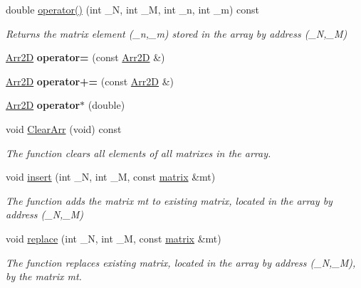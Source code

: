 \begin{DoxyCompactItemize}
\mbox{\label{class_arr2_d_acfb2cee23c6fdd3e85971580ac1966c7}} 
double \mbox{\hyperlink{class_arr2_d_acfb2cee23c6fdd3e85971580ac1966c7}{operator()}} (int \+\_\+N, int \+\_\+M, int \+\_\+n, int \+\_\+m) const
\begin{DoxyCompactList}\small\item\em Returns the matrix element (\+\_\+n,\+\_\+m) stored in the array by address (\+\_\+N,\+\_\+M) \end{DoxyCompactList}\item 
\mbox{\label{class_arr2_d_af6fac280c6350de3bf998d64480ec50b}} 
\mbox{\hyperlink{class_arr2_d}{Arr2D}} {\bfseries operator=} (const \mbox{\hyperlink{class_arr2_d}{Arr2D}} \&)
\item 
\mbox{\label{class_arr2_d_aa652c84f2741466fb2275dd6a1c434e7}} 
\mbox{\hyperlink{class_arr2_d}{Arr2D}} {\bfseries operator+=} (const \mbox{\hyperlink{class_arr2_d}{Arr2D}} \&)
\item 
\mbox{\label{class_arr2_d_ac1e1a96570628b2823fe418a862845a0}} 
\mbox{\hyperlink{class_arr2_d}{Arr2D}} {\bfseries operator$\ast$} (double)
\item 
\mbox{\label{class_arr2_d_a0f97b167a7657cab0a898feffd13ea64}} 
void \mbox{\hyperlink{class_arr2_d_a0f97b167a7657cab0a898feffd13ea64}{Clear\+Arr}} (void) const
\begin{DoxyCompactList}\small\item\em The function clears all elements of all matrixes in the array. ~\newline
 \end{DoxyCompactList}\item 
void \mbox{\hyperlink{class_arr2_d_aee51dbd3ea4719ab1aa13ec474e46427}{insert}} (int \+\_\+N, int \+\_\+M, const \mbox{\hyperlink{classmatrix}{matrix}} \&mt)
\begin{DoxyCompactList}\small\item\em The function adds the matrix mt to existing matrix, located in the array by address (\+\_\+N,\+\_\+M) \end{DoxyCompactList}\item 
void \mbox{\hyperlink{class_arr2_d_acd1a53b083550ba287f6533876256b76}{replace}} (int \+\_\+N, int \+\_\+M, const \mbox{\hyperlink{classmatrix}{matrix}} \&mt)
\begin{DoxyCompactList}\small\item\em The function replaces existing matrix, located in the array by address (\+\_\+N,\+\_\+M), by the matrix mt. \end{DoxyCompactList}\end{DoxyCompactItemize}
